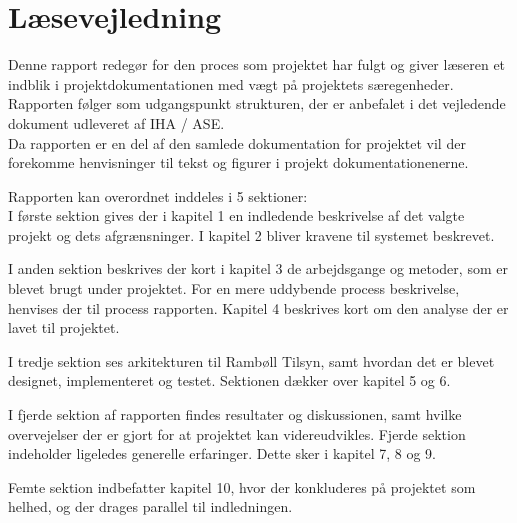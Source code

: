 \chapter*{Læsevejledning}
Denne rapport redegør for den proces som projektet har fulgt og giver læseren et indblik i projektdokumentationen med vægt på projektets særegenheder. Rapporten følger som udgangspunkt strukturen, der er anbefalet i det vejledende dokument udleveret af IHA / ASE.\\
Da rapporten er en del af den samlede dokumentation for projektet vil der forekomme
henvisninger til tekst og figurer i projekt dokumentationenerne.


Rapporten kan overordnet inddeles i 5 sektioner:\\
I første sektion gives der i kapitel 1 en indledende beskrivelse af det valgte projekt og
dets afgrænsninger. I kapitel 2 bliver kravene til systemet beskrevet.

I anden sektion beskrives der kort i kapitel 3 de arbejdsgange og metoder, som er blevet brugt
under projektet. For en mere uddybende process beskrivelse, henvises der til process rapporten.
Kapitel 4 beskrives kort om den analyse der er lavet til projektet.

I tredje sektion ses arkitekturen til Rambøll Tilsyn, samt hvordan det er blevet designet, implementeret og testet. 
Sektionen dækker over kapitel 5 og 6.

I fjerde sektion af rapporten findes resultater og diskussionen, samt hvilke overvejelser
der er gjort for at projektet kan videreudvikles. Fjerde sektion indeholder ligeledes generelle erfaringer. 
Dette sker i kapitel 7, 8 og 9.

Femte sektion indbefatter kapitel 10, hvor der konkluderes på projektet som helhed, og
der drages parallel til indledningen.


